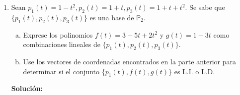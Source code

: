 \documentclass[12pt]{article}
\newenvironment{solucion}
{\begin{mdframed}[backgroundcolor=black!10]
		{\bf Solución:}\\
	}
	{
	\end{mdframed}
}
\newenvironment{preguntas}
{\begin{enumerate}\itemsep12pt
	}
	{
	\end{enumerate}
}
\begin{document}
\begin{preguntas}
\begin{solucion}
		Ahora, para probar que los elementos del conjunto son $L.I.$, basta con probar que los vectores de coordenadas lo son. Para esto, ponemos los vectores en una matriz y pivoteamos:
		$$\begin{bmatrix}
		1 & 0 & 1\\
		0 & 1 & 1\\
		-2 & 0 & -2\\
		-1 & 2 & 0
		\end{bmatrix} \sim
		\begin{bmatrix}
		1 & 0 & 1\\
		0 & 1 & 1\\
		0 & 0 & 1\\
		0 & 0 & 0
		\end{bmatrix}$$
		Con lo que concluimos que son $L.I.$
		$$\blacksquare$$
\end{solucion}
\item Sean $p_1(t) = 1-t^2, p_2(t) = 1+t, p_3(t) = 1+t+t^2$. Se sabe que $\{p_1(t), p_2(t), p_3(t)\}$ es una base de $\mathbb{P}_2$.
\begin{enumerate}[a)]
\item Exprese los polinomios $f(t) = 3-5t + 2t^2$ y $g(t) = 1-3t$ como combinaciones lineales de $\{p_1(t), p_2(t), p_3(t)\}$.
\item Use los vectores de coordenadas encontrados en la parte anterior para determinar si el conjunto $\{p_1(t), f(t), g(t)\}$ es L.I. o L.D.
\end{enumerate}
\begin{solucion}


\end{solucion}
\end{preguntas}
\end{document}
